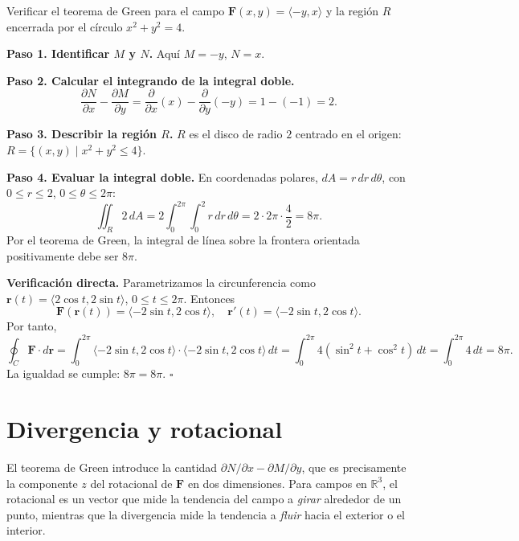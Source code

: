 \begin{example}
Verificar el teorema de Green para el campo $\mathbf{F}(x,y) =
\langle -y, x \rangle$ y la región $R$ encerrada por el círculo
$x^2+y^2=4$.
\end{example}

\begin{myproof}
\textbf{Paso 1. Identificar $M$ y $N$.}
Aquí $M=-y$, $N=x$.

\textbf{Paso 2. Calcular el integrando de la integral doble.}
\[
\frac{\partial N}{\partial x} - \frac{\partial M}{\partial y}
= \frac{\partial}{\partial x}(x) - \frac{\partial}{\partial y}(-y)
= 1 - (-1) = 2.
\]

\textbf{Paso 3. Describir la región $R$.}
$R$ es el disco de radio $2$ centrado en el origen:
$R = \{(x,y) \mid x^2+y^2 \le 4\}$.

\textbf{Paso 4. Evaluar la integral doble.}
En coordenadas polares, $dA = r\,dr\,d\theta$, con $0 \le r \le 2$,
$0 \le \theta \le 2\pi$:
\[
\iint_R 2\,dA = 2 \int_0^{2\pi} \int_0^2 r\,dr\,d\theta
= 2 \cdot 2\pi \cdot \frac{4}{2} = 8\pi.
\]
Por el teorema de Green, la integral de línea sobre la frontera
orientada positivamente debe ser $8\pi$.

\textbf{Verificación directa.}
Parametrizamos la circunferencia como $\mathbf{r}(t)=\langle 2\cos t,
2\sin t \rangle$, $0 \le t \le 2\pi$. Entonces
\[
\mathbf{F}(\mathbf{r}(t)) = \langle -2\sin t, 2\cos t \rangle,
\quad \mathbf{r}'(t) = \langle -2\sin t, 2\cos t \rangle.
\]
Por tanto,
\[
\oint_C \mathbf{F}\cdot d\mathbf{r}
= \int_0^{2\pi} \langle -2\sin t, 2\cos t \rangle \cdot
\langle -2\sin t, 2\cos t \rangle \, dt
= \int_0^{2\pi} 4(\sin^2 t + \cos^2 t)\,dt
= \int_0^{2\pi} 4\,dt = 8\pi.
\]
La igualdad se cumple: $\boxed{8\pi = 8\pi}$. $\square$
\end{myproof}

\section{Divergencia y rotacional}

El teorema de Green introduce la cantidad $\partial N/\partial x -
\partial M/\partial y$, que es precisamente la componente $z$ del
rotacional de $\mathbf{F}$ en dos dimensiones. Para campos en
$\mathbb{R}^3$, el rotacional es un vector que mide la tendencia del
campo a \emph{girar} alrededor de un punto, mientras que la divergencia
mide la tendencia a \emph{fluir} hacia el exterior o el interior.

